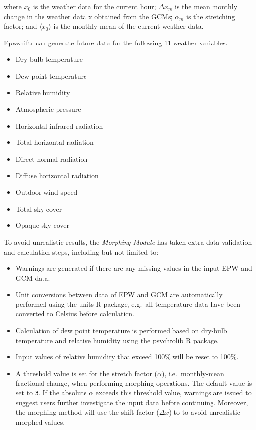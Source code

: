 \documentclass[twocolumn, a4paper,10pt]{article}
\providecommand{\tightlist}{\setlength{\itemsep}{0pt}\setlength{\parskip}{0pt}}
\begin{document}
where \(x_0\) is the weather data for the current hour; \(\Delta x_m\) is the mean
monthly change in the weather data x obtained from the GCMs; \(\alpha _m\) is the
stretching factor; and \(\langle x_0 \rangle\) is the monthly mean of the current
weather data.

Epwshiftr can generate future data for the following 11 weather variables:

\begin{itemize}
\tightlist
\item
  Dry-bulb temperature
\item
  Dew-point temperature
\item
  Relative humidity
\item
  Atmospheric pressure
\item
  Horizontal infrared radiation
\item
  Total horizontal radiation
\item
  Direct normal radiation
\item
  Diffuse horizontal radiation
\item
  Outdoor wind speed
\item
  Total sky cover
\item
  Opaque sky cover
\end{itemize}

To avoid unrealistic results, the \emph{Morphing Module} has taken extra data
validation and calculation steps, including but not limited to:

\begin{itemize}
\tightlist
\item
  Warnings are generated if there are any missing values in the input EPW and
  GCM data.
\item
  Unit conversions between data of EPW and GCM are automatically performed using
  the units \citep{pebesma2016measurement} R package, e.g.~all temperature data have
  been converted to Celsius before calculation.
\item
  Calculation of dew point temperature is performed based on dry-bulb
  temperature and relative humidity using the psychrolib \citep{meyer2019psychrolib}
  R package.
\item
  Input values of relative humidity that exceed 100\% will be reset to 100\%.
\item
  A threshold value is set for the stretch factor (\(\alpha\)), i.e.~monthly-mean
  fractional change, when performing morphing operations. The default value is
  set to \texttt{3}. If the absolute \(\alpha\) exceeds this threshold value, warnings
  are issued to suggest users further investigate the input data before
  continuing. Moreover, the morphing method will use the shift factor (\(\Delta x\))
  to to avoid unrealistic morphed values.
\end{itemize}
\end{document}
